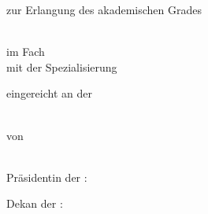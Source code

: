 \makeatletter
\begin{titlepage}
\begin{spacing}{1}
  \setlength{\parindentbak}{\parindent}
  \setlength{\parskipbak}{\parskip}

\setlength{\parindent}{0pt}
\setlength{\parskip}{\baselineskip}

\thispagestyle{empty}

\expandafter\Hu@titlepagefont\expandafter

\begin{center}
{\LARGE \textbf{\ifx\Hu@doctitle\empty{}\else\Hu@doctitle\fi}}

\ifx\Hu@docsubtitle\empty{}\else\Hu@docsubtitle\fi


zur Erlangung des akademischen Grades

\ifx\Hu@degree\empty{}\else\Hu@degree\fi\\
im Fach
\ifx\Hu@subject\empty{}\else\Hu@subject\fi\\
mit der Spezialisierung
\ifx\Hu@specialization\empty{}\else\Hu@specialization\fi


eingereicht an der\\
\ifx\Hu@faculty\empty{}\else\Hu@faculty\fi\\
\ifx\Hu@university\empty{}\else\Hu@university\fi

von\\
\textbf{\ifx\Hu@authorprefix\empty{}\else\Hu@authorprefix\fi\ \ifx\Hu@authorfirstname\empty{}\else\Hu@authorfirstname\fi\ \ifx\Hu@authorsurname\empty{}\else\Hu@authorsurname\fi\ \ifx\Hu@authorsuffix\empty{}\else\Hu@authorsuffix\fi}\\
\ifx\Hu@authoradd\empty{}\else\Hu@authoradd\fi
\end{center}

\vfill

Pr\"asidentin der \ifx\Hu@university\empty{}\else\Hu@university\fi:\\
\ifx\Hu@president\empty{}\else\Hu@president\fi

Dekan der \ifx\Hu@faculty\empty{}\else\Hu@faculty\fi:\\
\ifx\Hu@dean\empty{}\else\Hu@dean\fi


\end{spacing}
\end{titlepage}
